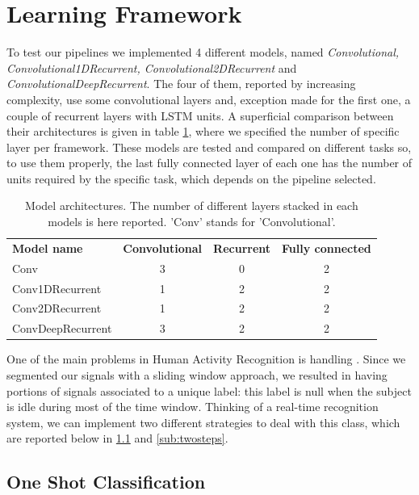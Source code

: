 \section{Learning Framework}
\label{sec:learning_framework}

To test our pipelines we implemented 4 different models, named \textit{Convolutional, Convolutional1DRecurrent, Convolutional2DRecurrent} and \textit{ConvolutionalDeepRecurrent}. The four of them, reported by increasing complexity, use some convolutional layers and, exception made for the first one, a couple of recurrent layers with LSTM units. A superficial comparison between their architectures is given in table \ref{tab:models}, where we specified the number of specific layer per framework.
These models are tested and compared on different tasks so, to use them properly, the last fully connected layer of each one has the number of units required by the specific task, which depends on the pipeline selected.

\begin{table}[]
	\begin{tabular}{lccc}
		\textbf{Model name}        & \textbf{Convolutional} & \textbf{Recurrent} & \textbf{Fully connected} \\
		Conv              & 3             & 0         & 2			   \\
		Conv1DRecurrent   & 1             & 2         & 2               \\
		Conv2DRecurrent   & 1             & 2         & 2               \\
		ConvDeepRecurrent & 3             & 2         & 2
	\end{tabular}
	\caption{Model architectures. The number of different layers stacked in each models is here reported. 'Conv' stands for 'Convolutional'.}
	\label{tab:models}
\end{table}

One of the main problems in Human Activity Recognition is handling . Since we segmented our signals with a sliding window approach, we resulted in having portions of signals associated to a unique label: this label is null when the subject is idle during most of the time window. Thinking of a real-time recognition system, we can implement two different strategies to deal with this class, which are reported below in \ref{sub:oneshot} and \ref{sub:twosteps}.

\subsection{One Shot Classification}
\label{sub:oneshot}

